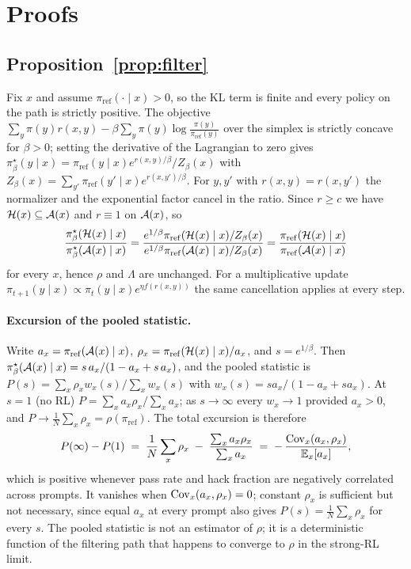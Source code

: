 \section{Proofs}
\label{app:proofs}

\subsection{Proposition~\ref{prop:filter}}

Fix $x$ and assume $\pi_{\mathrm{ref}}(\cdot\mid x)>0$, so the KL term is finite and every policy on the path is strictly positive. The objective $\sum_y \pi(y)r(x,y) - \beta\sum_y \pi(y)\log\frac{\pi(y)}{\pi_{\mathrm{ref}}(y)}$ over the simplex is strictly concave for $\beta>0$; setting the derivative of the Lagrangian to zero gives $\pi^\star_\beta(y\mid x) = \pi_{\mathrm{ref}}(y\mid x)e^{r(x,y)/\beta}/Z_\beta(x)$ with $Z_\beta(x)=\sum_{y'}\pi_{\mathrm{ref}}(y'\mid x)e^{r(x,y')/\beta}$. For $y,y'$ with $r(x,y)=r(x,y')$ the normalizer and the exponential factor cancel in the ratio. Since $r\geq c$ we have $\mathcal{H}(x)\subseteq\mathcal{A}(x)$ and $r\equiv 1$ on $\mathcal{A}(x)$, so
\[
\frac{\pi^\star_\beta(\mathcal{H}(x)\mid x)}{\pi^\star_\beta(\mathcal{A}(x)\mid x)}
= \frac{e^{1/\beta}\pi_{\mathrm{ref}}(\mathcal{H}(x)\mid x)/Z_\beta(x)}{e^{1/\beta}\pi_{\mathrm{ref}}(\mathcal{A}(x)\mid x)/Z_\beta(x)}
= \frac{\pi_{\mathrm{ref}}(\mathcal{H}(x)\mid x)}{\pi_{\mathrm{ref}}(\mathcal{A}(x)\mid x)}
\]
for every $x$, hence $\rho$ and $\Lambda$ are unchanged. For a multiplicative update $\pi_{t+1}(y\mid x)\propto\pi_t(y\mid x)e^{\eta f(r(x,y))}$ the same cancellation applies at every step.

\paragraph{Excursion of the pooled statistic.} Write $a_x = \pi_{\mathrm{ref}}(\mathcal{A}(x)\mid x)$, $\rho_x = \pi_{\mathrm{ref}}(\mathcal{H}(x)\mid x)/a_x$, and $s=e^{1/\beta}$. Then $\pi^\star_\beta(\mathcal{A}(x)\mid x) = s\,a_x/(1-a_x+s\,a_x)$, and the pooled statistic is $P(s) = \sum_x \rho_x w_x(s)/\sum_x w_x(s)$ with $w_x(s)=s a_x/(1-a_x+s a_x)$. At $s=1$ (no RL) $P = \sum_x a_x\rho_x/\sum_x a_x$; as $s\to\infty$ every $w_x\to1$ provided $a_x>0$, and $P \to \frac1N\sum_x \rho_x = \rho(\pi_{\mathrm{ref}})$. The total excursion is therefore
\[
P(\infty)-P(1) \;=\; \frac1N\sum_x \rho_x \;-\; \frac{\sum_x a_x\rho_x}{\sum_x a_x}
\;=\; -\,\frac{\operatorname{Cov}_x(a_x,\rho_x)}{\mathbb{E}_x[a_x]},
\]
which is positive whenever pass rate and hack fraction are negatively correlated across prompts. It vanishes when $\operatorname{Cov}_x(a_x,\rho_x)=0$; constant $\rho_x$ is sufficient but not necessary, since equal $a_x$ at every prompt also gives $P(s)=\frac1N\sum_x\rho_x$ for every $s$. The pooled statistic is not an estimator of $\rho$; it is a deterministic function of the filtering path that happens to converge to $\rho$ in the strong-RL limit.

